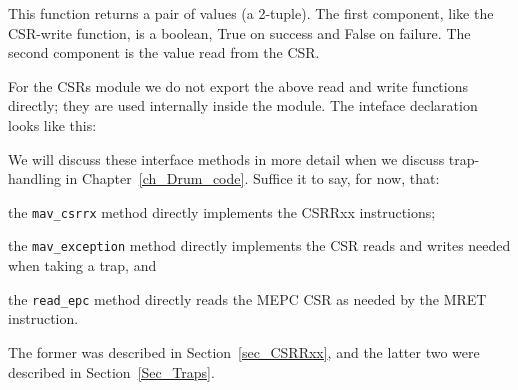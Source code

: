 
This function returns a pair of values (a 2-tuple).  The first
component, like the CSR-write function, is a boolean, True on success
and False on failure.  The second component is the value read from the
CSR.

For the CSRs module we do not export the above read and write
functions directly; they are used internally inside the module.  The
inteface declaration looks like this:


We will discuss these interface methods in more detail when we discuss
trap-handling in Chapter~\ref{ch_Drum_code}.  Suffice it to say, for
now, that:

\begin{tightlist}

 \item the \verb|mav_csrrx| method directly implements the CSRRxx instructions;

 \item the \verb|mav_exception| method directly implements the CSR
       reads and writes needed when taking a trap, and

 \item the \verb|read_epc| method directly reads the MEPC CSR as
       needed by the MRET instruction.

\end{tightlist}
The former was described in Section~\ref{sec_CSRRxx}, and the latter
two were described in Section~\ref{Sec_Traps}.

